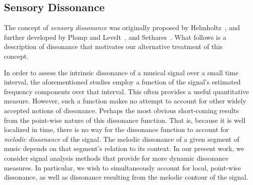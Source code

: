 \subsection{Sensory Dissonance}
The concept of \emph{sensory dissonance} was originally proposed
by Helmholtz~\citeyear{Helmholtz:1877}, and further developed by Plomp and 
Levelt~\citeyear{Plomp:1965}, and Sethares~\citeyear{Sethares:1997}.
What follows is a %
description of dissonance that motivates our alternative treatment of
this concept.

In order to assess the intrinsic dissonance of a musical signal over a
small time interval, the aforementioned studies employ a function of
the signal's estimated frequency components over that interval.
This often provides a useful quantitative measure.  However, such a
function makes no attempt to account for other widely accepted notions
of dissonance.   
Perhaps the most obvious short-coming results from the point-wise
nature of this dissonance function.  That is, because it is
well localized in time, there is no way for the dissonance function to account
for \emph{melodic dissonance} of the signal.  The melodic
dissonance of a given segment of music depends on that 
segment's relation to its context.  In our present work, we
consider signal analysis methods that provide for
more dynamic dissonance measures.  In particular, we wish to simultaneously
account for local, point-wise dissonance, as well as dissonance resulting from
the melodic contour of the signal.  

